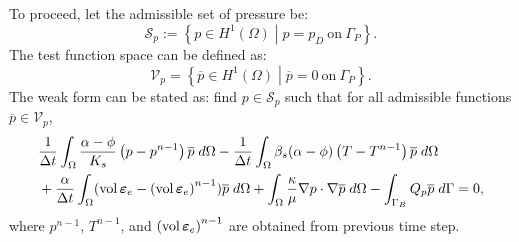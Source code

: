 
To proceed, let the admissible set of pressure be:
\begin{equation*}
	\mathscr{S}_p := \left\{p \in H^1 (\Omega) \middle|
	p = p_D~\text{on}~\Gamma_P \right\}.
\end{equation*}
The test function space can be defined as:
\begin{equation*}
\mathscr{V}_{p}= \left \{{\overline{p}}\in H^1(\Omega) \middle | {\overline{p}} =0~\text{on}~\Gamma_P\right \}.
\end{equation*}
The weak form can be stated as: find $p\in\mathscr{S}_p$ such that for all admissible functions $\overline{p}\in\mathscr{V}_p$,
\begin{equation} \label{Eq:waekform_p}
    \begin{aligned}
     &\frac{1}{\Delta t} \int_{\Omega} \frac{\alpha-\phi}{K_s} \left(p-p^{n-1}\right){\overline{p}} \; d\Omega-\frac{1}{\Delta t} \int_{\Omega} \beta_s(\alpha-\phi) \left(T-T^{n-1}\right){\overline{p}} \; d\Omega\\&+\frac{\alpha}{\Delta t} \int_{\Omega} (\operatorname{vol}\bm{\varepsilon}_e-\left(\operatorname{vol}\bm{\varepsilon}_e\right)^{n-1}){\overline{p}} \; d\Omega+\int_{\Omega}  \frac{\kappa}{\mu} \nabla p \cdot \nabla {\overline{p}} \; d\Omega   
     -\int_{\Gamma_B} Q_p {\overline{p}} \; d\Gamma =0,
    \end{aligned}
\end{equation}
where $p^{n-1}$, $T^{n-1}$, and $\left(\operatorname{vol}\bm{\varepsilon}_e\right)^{n-1}$ are obtained from previous time step.

